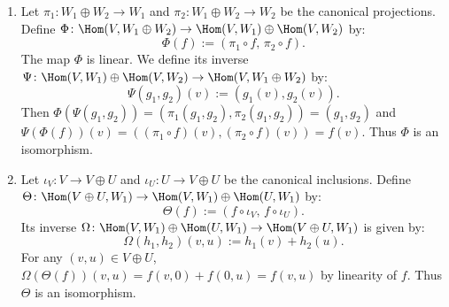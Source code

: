 \begin{exercisesolution}
\label{sol:hom_direct_sum_decompositions}
\begin{enumerate}[label=\textbf{(\alph*)}]
    \item Let $\pi_1 \colon W_1 \oplus W_2 \to W_1$ and $\pi_2 \colon W_1 \oplus W_2 \to W_2$ be the canonical projections.
    Define $\Phi \colon \Hom(V, W_1 \oplus W_2) \to \Hom(V, W_1) \oplus \Hom(V, W_2)$ by:
    \[
    \Phi(f) := (\pi_1 \circ f, \, \pi_2 \circ f).
    \]
    The map $\Phi$ is linear. We define its inverse $\Psi \colon \Hom(V, W_1) \oplus \Hom(V, W_2) \to \Hom(V, W_1 \oplus W_2)$ by:
    \[
    \Psi(g_1, g_2)(v) := (g_1(v), g_2(v)).
    \]
    Then $\Phi(\Psi(g_1, g_2)) = (\pi_1(g_1, g_2), \pi_2(g_1, g_2)) = (g_1, g_2)$ and $\Psi(\Phi(f))(v) = ((\pi_1 \circ f)(v), (\pi_2 \circ f)(v)) = f(v)$.
    Thus $\Phi$ is an isomorphism.

    \item Let $\iota_V \colon V \to V \oplus U$ and $\iota_U \colon U \to V \oplus U$ be the canonical inclusions.
    Define $\Theta \colon \Hom(V \oplus U, W_1) \to \Hom(V, W_1) \oplus \Hom(U, W_1)$ by:
    \[
    \Theta(f) := (f \circ \iota_V, \, f \circ \iota_U).
    \]
    Its inverse $\Omega \colon \Hom(V, W_1) \oplus \Hom(U, W_1) \to \Hom(V \oplus U, W_1)$ is given by:
    \[
    \Omega(h_1, h_2)(v, u) := h_1(v) + h_2(u).
    \]
    For any $(v, u) \in V \oplus U$, $\Omega(\Theta(f))(v, u) = f(v, 0) + f(0, u) = f(v, u)$ by linearity of $f$.
    Thus $\Theta$ is an isomorphism. \qedhere
\end{enumerate}
\end{exercisesolution}


